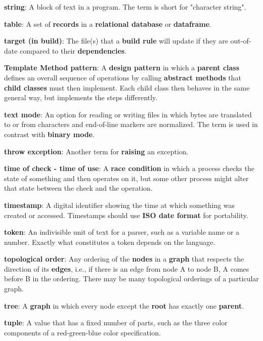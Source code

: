 \documentclass{scrbook}
\newcommand{\glosskey}[1]{\textbf{#1}}
\begin{document}
\noindent \textbf{\glosskey{string}}: 
A block of text in a program. The term is short for "character string".


\noindent \textbf{\glosskey{table}}: 
A set of \glosskey{records} in a \glosskey{relational database} or \glosskey{dataframe}.


\noindent \textbf{\glosskey{target (in build)}}: 
The file(s) that a \glosskey{build rule} will update if they are out-of-date compared to their \glosskey{dependencies}.


\noindent \textbf{\glosskey{Template Method pattern}}: 
A \glosskey{design pattern} in which a \glosskey{parent class} defines an overall sequence of operations by calling \glosskey{abstract methods} that \glosskey{child classes} must then implement. Each child class then behaves in the same general way, but implements the steps differently.


\noindent \textbf{\glosskey{text mode}}: 
An option for reading or writing files in which bytes are translated to or from characters and end-of-line markers are normalized. The term is used in contrast with \glosskey{binary mode}.


\noindent \textbf{\glosskey{throw exception}}: 
Another term for \glosskey{raising} an exception.


\noindent \textbf{\glosskey{time of check - time of use}}: 
A \glosskey{race condition} in which a process checks the state of something and then operates on it, but some other process might alter that state between the check and the operation.


\noindent \textbf{\glosskey{timestamp}}: 
A digital identifier showing the time at which something was created or accessed. Timestamps should use \glosskey{ISO date format} for portability.


\noindent \textbf{\glosskey{token}}: 
An indivisible unit of text for a parser, such as a variable name or a number. Exactly what constitutes a token depends on the language.


\noindent \textbf{\glosskey{topological order}}: 
Any ordering of the \glosskey{nodes} in a \glosskey{graph} that respects the direction of its \glosskey{edges}, i.e., if there is an edge from node A to node B, A comes before B in the ordering. There may be many topological orderings of a particular graph.


\noindent \textbf{\glosskey{tree}}: 
A \glosskey{graph} in which every node except the \glosskey{root} has exactly one \glosskey{parent}.


\noindent \textbf{\glosskey{tuple}}: 
A value that has a fixed number of parts, such as the three color components of a red-green-blue color specification.
\end{document}

